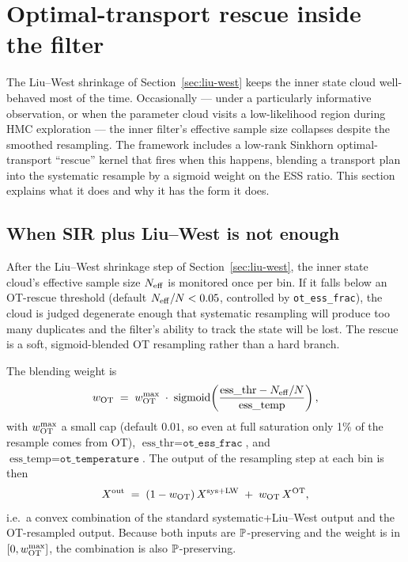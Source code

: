 \section{Optimal-transport rescue inside the filter} \label{sec:ot-rescue}

The Liu--West shrinkage of Section~\ref{sec:liu-west} keeps the inner
state cloud well-behaved most of the time. Occasionally --- under a
particularly informative observation, or when the parameter cloud
visits a low-likelihood region during HMC exploration --- the inner
filter's effective sample size collapses despite the smoothed
resampling. The framework includes a low-rank Sinkhorn optimal-transport
``rescue'' kernel that fires when this happens, blending a transport
plan into the systematic resample by a sigmoid weight on the ESS
ratio. This section explains what it does and why it has the form it
does.

\subsection{When SIR plus Liu--West is not enough}

After the Liu--West shrinkage step of Section~\ref{sec:liu-west}, the
inner state cloud's effective sample size $N_{\rm eff}$ is monitored
once per bin. If it falls below an OT-rescue threshold (default
$N_{\rm eff} / N < 0.05$, controlled by \texttt{ot\_ess\_frac}), the
cloud is judged degenerate enough that systematic resampling will
produce too many duplicates and the filter's ability to track the
state will be lost. The rescue is a soft, sigmoid-blended OT
resampling rather than a hard branch.

The blending weight is
\begin{equation}
w_{\rm OT} \;=\; w_{\rm OT}^{\max} \;\cdot\;
   \mathrm{sigmoid}\!\left(\frac{\text{ess\_thr} - N_{\rm eff}/N}
                          {\text{ess\_temp}}\right),
\label{eq:ot-blend}
\end{equation}
with $w_{\rm OT}^{\max}$ a small cap (default $0.01$, so even at full
saturation only 1\% of the resample comes from OT),
$\text{ess\_thr} = \texttt{ot\_ess\_frac}$, and
$\text{ess\_temp} = \texttt{ot\_temperature}$. The output of the
resampling step at each bin is then
\begin{equation}
X^{\rm out} \;=\; (1 - w_{\rm OT})\, X^{\rm sys+LW}
                \;+\; w_{\rm OT}\, X^{\rm OT},
\end{equation}
i.e.\ a convex combination of the standard systematic+Liu--West output
and the OT-resampled output. Because both inputs are
$\mathbb{P}$-preserving and the weight is in $[0, w_{\rm OT}^{\max}]$, the
combination is also $\mathbb{P}$-preserving.

